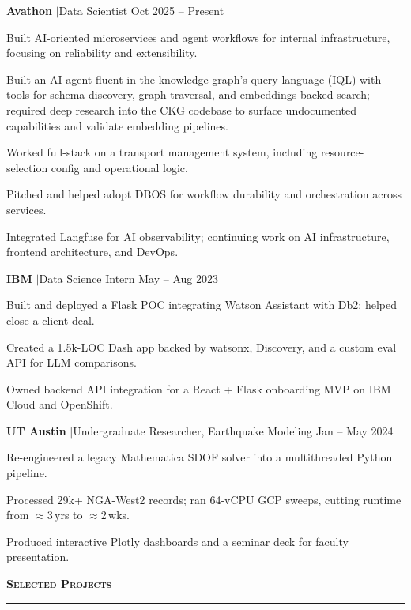 \documentclass[letterpaper,10.5pt]{article}
\renewcommand{\section}[1]{%
  \vspace{0.5em}%
  {\normalsize\bfseries\scshape #1}%
  \vspace{-0.5em}%
  \par\noindent\rule{\textwidth}{0.4pt}%
  \vspace{0.15em}%
}
\let\olditemize\itemize
\let\oldenditemize\enditemize
\renewenvironment{itemize}{%
  \olditemize
  \setlength{\itemsep}{1pt}%
  \setlength{\parskip}{0pt}%
  \setlength{\parsep}{0pt}%
  \setlength{\topsep}{1.5pt}%
  \setlength{\leftmargin}{1.2em}%
}{\oldenditemize}
\begin{document}
{\small
\textbf{Avathon} \enspace$\vert$\enspace Data Scientist \hfill Oct 2025 -- Present
\begin{itemize}
  \item Built AI-oriented microservices and agent workflows for internal infrastructure, focusing on reliability and extensibility.
  \item Built an AI agent fluent in the knowledge graph's query language (IQL) with tools for schema discovery, graph traversal, and embeddings-backed search; required deep research into the CKG codebase to surface undocumented capabilities and validate embedding pipelines.
  \item Worked full-stack on a transport management system, including resource-selection config and operational logic.
  \item Pitched and helped adopt DBOS for workflow durability and orchestration across services.
  \item Integrated Langfuse for AI observability; continuing work on AI infrastructure, frontend architecture, and DevOps.
\end{itemize}

\textbf{IBM} \enspace$\vert$\enspace Data Science Intern \hfill May -- Aug 2023
\begin{itemize}
  \item Built and deployed a Flask POC integrating Watson Assistant with Db2; helped close a client deal.
  \item Created a 1.5k-LOC Dash app backed by watsonx, Discovery, and a custom eval API for LLM comparisons.
  \item Owned backend API integration for a React + Flask onboarding MVP on IBM Cloud and OpenShift.
\end{itemize}

\textbf{UT Austin} \enspace$\vert$\enspace Undergraduate Researcher, Earthquake Modeling \hfill Jan -- May 2024
\begin{itemize}
  \item Re-engineered a legacy Mathematica SDOF solver into a multithreaded Python pipeline.
  \item Processed 29k+ NGA-West2 records; ran 64-vCPU GCP sweeps, cutting runtime from $\approx$3\,yrs to $\approx$2\,wks.
  \item Produced interactive Plotly dashboards and a seminar deck for faculty presentation.
\end{itemize}
}

\section{Selected Projects}
\end{document}
